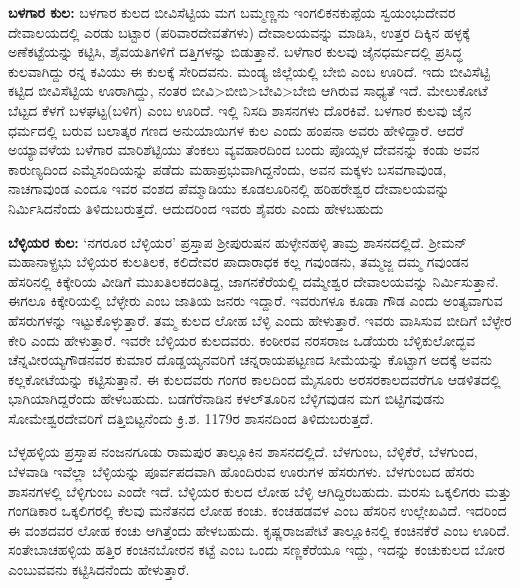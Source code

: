 \textbf{ಬಳಗಾರ ಕುಲ:} ಬಳಗಾರ ಕುಲದ ಬೀವಿಸೆಟ್ಟಿಯ ಮಗ ಬಮ್ಮಣ್ಣನು ಇಂಗಲಿಕನಕುಪ್ಪೆಯ ಸ್ವಯಂಭುದೇವರ ದೇವಾಲಯದಲ್ಲಿ ಎರಡು ಬಟ್ಟಾರ (ಪರಿವಾರದೇವತೆಗಳು) ದೇವಾಲಯವನ್ನು ಮಾಡಿಸಿ, ಉತ್ತರ ದಿಕ್ಕಿನ ಹಳ್ಳಕ್ಕೆ ಅಣೆಕಟ್ಟೆಯನ್ನು ಕಟ್ಟಿಸಿ, ಶೈವಯತಿಗಳಿಗೆ ದತ್ತಿಗಳನ್ನು ಬಿಡುತ್ತಾನೆ. ಬಳೆಗಾರ ಕುಲವು ಜೈನಧರ್ಮದಲ್ಲಿ ಪ್ರಸಿದ್ಧ ಕುಲವಾಗಿದ್ದು ರನ್ನ ಕವಿಯು ಈ ಕುಲಕ್ಕೆ ಸೇರಿದವನು. ಮಂಡ್ಯ ಜಿಲ್ಲೆಯಲ್ಲಿ ಬೇಬಿ ಎಂಬ ಊರಿದೆ. ಇದು ಬೀವಿಸೆಟ್ಟಿ ಕಟ್ಟಿದ ಬೀವಿಸೆಟ್ಟಿಯ ಊರಾಗಿದ್ದು, ನಂತರ ಬೀವಿ\textgreater ಬೀಬಿ\textgreater ಬೇವಿ\textgreater ಬೇಬಿ ಆಗಿರುವ ಸಾಧ್ಯತೆ ಇದೆ. ಮೇಲುಕೋಟೆ ಬೆಟ್ಟದ ಕೆಳಗೆ ಬಳಘಟ್ಟ(ಬಳಿಗ) ಎಂಬ ಊರಿದೆ. ಇಲ್ಲಿ ನಿಸದಿ ಶಾಸನಗಳು ದೊರಕಿವೆ. ಬಳಗಾರ ಕುಲವು ಜೈನ ಧರ್ಮದಲ್ಲಿ ಬರುವ ಬಲಾತ್ಕರ ಗಣದ ಅನುಯಾಯಿಗಳ ಕುಲ ಎಂದು ಹಂಪನಾ ಅವರು ಹೇಳಿದ್ದಾರೆ. ಆದರೆ ಅಯ್ಯಾವಳೆಯ ಬಳೆಗಾರ ಮಾರಿಶೆಟ್ಟಿಯು ತೆಂಕಲು ವ್ಯವಹಾರದಿಂದ ಬಂದು ಪೊಯ್ಸಳ ದೇವನನ್ನು ಕಂಡು ಅವನ ಕಾರುಣ್ಯದಿಂದ ಎಮ್ಮೆಸಂದಿಯನ್ನು ಪಡೆದು ಮಹಾಪ್ರಭುವಾಗಿದ್ದನೆಂದು, ಅವನ ಮಕ್ಕಳು ಬಸವಗಾವುಂಡ, ನಾಚಗಾವುಂಡ ಎಂದೂ ಇವರ ವಂಶದ ಪೆಮ್ಮಾಡಿಯು ಕೂಡಲೂರಿನಲ್ಲಿ ಹರಿಹರೇಶ್ವರ ದೇವಾಲಯವನ್ನು ನಿರ್ಮಿಸಿದನೆಂದು ತಿಳಿದುಬರುತ್ತದೆ. ಆದುದರಿಂದ ಇವರು ಶೈವರು ಎಂದು ಹೇಳಬಹುದು

\textbf{ಬೆಳ್ಳಿಯರ ಕುಲ:} ‘ನಗರೂರ ಬೆಳ್ಳಿಯರ’ ಪ್ರಸ್ತಾಪ ಶ‍್ರೀಪುರುಷನ ಹುಳ್ಳೇನಹಳ್ಳಿ ತಾಮ್ರ ಶಾಸನದಲ್ಲಿದೆ. ಶ‍್ರೀಮನ್​ಮಹಾನಾಳ್ಪ್ರಭು ಬೆಳ್ಳಿಯರ ಕುಲತಿಲಕ, ಕಲಿದೇವರ ಪಾದಾರಾಧಕ ಕಲ್ಲ ಗವುಂಡನು, ತಮ್ಮಜ್ಜ ದಮ್ಮ ಗವುಂಡನ ಹೆಸರಿನಲ್ಲಿ ಕಿಕ್ಕೇರಿಯ ವೀಡಿಗೆ ಮುಖತಿಲಕದಂತಿದ್ದ, ಜಾಗನಕೆರೆಯಲ್ಲಿ ದಮ್ಮೇಶ್ವರ ದೇವಾಲಯವನ್ನು ನಿರ್ಮಿಸುತ್ತಾನೆ. ಈಗಲೂ ಕಿಕ್ಕೇರಿಯಲ್ಲಿ ಬೆಳ್ಳೇರು ಎಂಬ ಜಾತಿಯ ಜನರು ಇದ್ದಾರೆ. ಇವರುಗಳೂ ಕೂಡಾ ಗೌಡ ಎಂದು ಅಂತ್ಯವಾಗುವ ಹೆಸರುಗಳನ್ನು ಇಟ್ಟುಕೊಳ್ಳುತ್ತಾರೆ. ತಮ್ಮ ಕುಲದ ಲೋಹ ಬೆಳ್ಳಿ ಎಂದು ಹೇಳುತ್ತಾರೆ. ಇವರು ವಾಸಿಸುವ ಬೀದಿಗೆ ಬೆಳ್ಳೇರ ಕೇರಿ ಎಂದು ಹೇಳುತ್ತಾರೆ. ಇವರೇ ಬೆಳ್ಳಿಯರ ಕುಲದವರು. ಕಂಠೀರವ ನರಸರಾಜ ಒಡೆಯರು ಬೆಳ್ಳಿಕುಲೋದ್ಭವ ಚೆನ್ನವೀರಯ್ಯಗೌಡನವರ ಕುಮಾರ ದೊಡ್ಡಯ್ಯನವರಿಗೆ ಚನ್ನರಾಯಪಟ್ಟಣದ ಸೀಮೆಯನ್ನು ಕೊಟ್ಟಾಗ ಅದಕ್ಕೆ ಅವನು ಕಲ್ಲಕೋಟೆಯನ್ನು ಕಟ್ಟಿಸುತ್ತಾನೆ. ಈ ಕುಲದವರು ಗಂಗರ ಕಾಲದಿಂದ ಮೈಸೂರು ಅರಸರಕಾಲದವರೆಗೂ ಆಡಳಿತದಲ್ಲಿ ಭಾಗಿಯಾಗಿದ್ದರೆಂದು ಹೇಳಬಹುದು. ಬಡಗೆರೆನಾಡಿನ ಕಳಲ್​ತೂರಿನ ಬೆಳ್ಳಿಗವುಡನ ಮಗ ಬಿಟ್ಟಿಗವುಡನು ಸೋಮೇಶ್ವರದೇವರಿಗೆ ದತ್ತಿಬಿಟ್ಟನೆಂದು ಕ್ರಿ.ಶ. 1179ರ ಶಾಸನದಿಂದ ತಿಳಿದುಬರುತ್ತದೆ.

ಬೆಳ್ಳಹಳ್ಳಿಯ ಪ್ರಸ್ತಾಪ ನಂಜನಗೂಡು ರಾಮಪುರ ತಾಲ್ಲೂಕಿನ ಶಾಸನದಲ್ಲಿದೆ. ಬೆಳಗುಂಬ, ಬೆಳ್ಳಿಕೆರೆ, ಬೆಳಗುಂದ, ಬೆಳವಾಡಿ ಇವೆಲ್ಲಾ ಬೆಳ್ಳಿಯನ್ನು ಪೂರ್ವಪದವಾಗಿ ಹೊಂದಿರುವ ಊರುಗಳ ಹೆಸರುಗಳು. ಬೆಳಗುಂಬದ ಹೆಸರು ಶಾಸನಗಳಲ್ಲಿ ಬೆಳ್ಳಿಗುಂಬ ಎಂದೇ ಇದೆ. ಬೆಳ್ಳಿಯರ ಕುಲದ ಲೋಹ ಬೆಳ್ಳಿ ಆಗಿದ್ದಿರಬಹುದು. ಮರಸು ಒಕ್ಕಲಿಗರು ಮತ್ತು ಗಂಗಡಿಕಾರ ಒಕ್ಕಲಿಗರಲ್ಲಿ ಕೆಲವು ಮನೆತನದ ಲೋಹ ಕಂಚು. ಕಂಚಹಡವಳ ಎಂಬ ಹೆಸರಿನ ಉಲ್ಲೇಖವಿದೆ. ಇದರಿಂದ ಈ ವಂಶದವರ ಲೋಹ ಕಂಚು ಆಗಿತ್ತೆಂದು ಹೇಳಬಹುದು. ಕೃಷ್ಣರಾಜಪೇಟೆ ತಾಲ್ಲೂಕಿನಲ್ಲಿ ಕಂಚಿನಕೆರೆ ಎಂಬ ಊರಿದೆ. ಸಂತೇಬಾಚಹಳ್ಳಿಯ ಹತ್ತಿರ ಕಂಚಿನಬೋರನ ಕಟ್ಟೆ ಎಂಬ ಒಂದು ಸಣ್ಣಕೆರೆಯೂ ಇದ್ದು, ಇದನ್ನು ಕಂಚುಕುಲದ ಬೋರ ಎಂಬುವವನು ಕಟ್ಟಿಸಿದನೆಂದು ಹೇಳುತ್ತಾರೆ.

